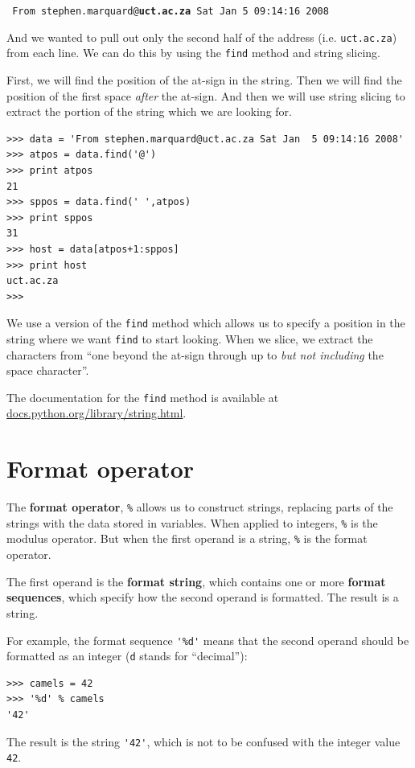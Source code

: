 \documentclass[10pt]{book}
\begin{document}
{\tt
From stephen.marquard@{\bf uct.ac.za} Sat Jan  5 09:14:16 2008
}

And we wanted to pull out only the second half of the address (i.e.
{\tt uct.ac.za}) from each line.  We can do this by using the {\tt find}
method and string slicing.   

First, we will find the position of the at-sign in the string.  Then we will
find the position of the first space {\em after} the at-sign.  And then we
will use string slicing to extract the portion of the string which we 
are looking for.

\beforeverb
\begin{verbatim}
>>> data = 'From stephen.marquard@uct.ac.za Sat Jan  5 09:14:16 2008'
>>> atpos = data.find('@')
>>> print atpos
21
>>> sppos = data.find(' ',atpos)
>>> print sppos
31
>>> host = data[atpos+1:sppos]
>>> print host
uct.ac.za
>>> 
\end{verbatim}
\afterverb
%
We use a version of the {\tt find} method which allows us to specify
a position in the string where we want {\tt find} to start looking.
When we slice, we extract the characters 
from ``one beyond the at-sign through up to {\em but not including} the 
space character''.  

The documentation for the {\tt find} method is available at
\url{docs.python.org/library/string.html}.

\section{Format operator}


The {\bf format operator}, {\tt \%}
allows us to construct strings, replacing parts of the strings
with the data stored in variables.
When applied to integers, {\tt \%} is the modulus operator.  But
when the first operand is a string, {\tt \%} is the format operator.


The first operand is the {\bf format string}, which contains
one or more {\bf format sequences}, which
specify how
the second operand is formatted.  The result is a string.


For example, the format sequence \verb"'%d'" means that
the second operand should be formatted as an
integer ({\tt d} stands for ``decimal''):

\beforeverb
\begin{verbatim}
>>> camels = 42
>>> '%d' % camels
'42'
\end{verbatim}
\afterverb
%
The result is the string \verb"'42'", which is not to be confused
with the integer value {\tt 42}.
\end{document}
